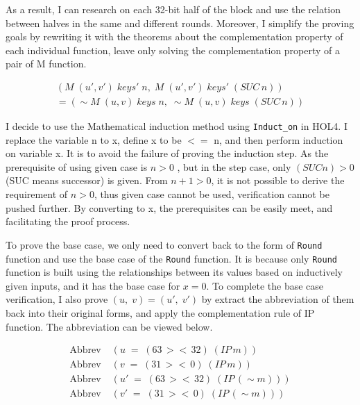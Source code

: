 \documentclass{article}
\begin{document}
As a result, I can research on each 32-bit
half of the block and use the relation between halves in the same and different rounds. Moreover, I simplify the proving goals by rewriting it with the theorems about the complementation
property of each individual function, leave only solving the complementation property of a pair of M function.

\begin{multline*}
(M \; (u', v') \; keys' \; n, \; M \; (u', v') \; keys' \; (SUC \, n)) \\
= (\sim M \; (u, v) \; keys \; n, \; \sim M \; (u, v) \; keys \; (SUC \, n))
\end{multline*}

I decide to use the Mathematical induction method using \verb|Induct_on| in HOL4. I replace the variable n to x, define x to be $<=$ n, and then
perform induction on variable x. It is to avoid the failure of proving the induction step. As the prerequisite of using
given case is $n>0$ , but in the step case, only $(SUC n) > 0$ (SUC means successor) is given. From $n+1 > 0$, it is not possible to
derive the requirement of $n > 0$, thus given case cannot be used, verification cannot be pushed further. By converting to x,
the prerequisites can be easily meet, and facilitating the proof process.

To prove the base case, we only need to convert back to the form of \verb|Round| function and use the base case of the \verb|Round| function.
It is because only \verb|Round| function is built using the relationships between its values based on inductively given inputs, and
it has the base case for $x=0$. To complete the
base case verification, I also prove $(u,\;v)= (u',\;v')$ by extract the abbreviation of them back into their original forms, and apply the complementation rule of
IP function. The abbreviation can be viewed below.

\begin{align*}
\text{Abbrev} \; & (u \;=\; (63 \,><\, 32) \; (IP \,m)) \\
\text{Abbrev} \; & (v \;=\; (31 \,><\, 0) \; (IP \,m)) \\
\text{Abbrev} \; & (u' \;=\; (63 \,><\, 32) \; (IP \,(\sim m))) \\
\text{Abbrev} \; & (v' \;=\; (31 \,><\, 0) \; (IP \,(\sim m)))
\end{align*}
\end{document}
